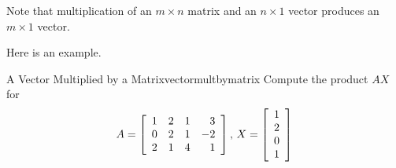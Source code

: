 Note that multiplication of an $m \times n$ matrix and an $n \times 1$ vector produces an $m \times 1$ vector.

Here is an example.

\begin{example}{A Vector Multiplied by a Matrix}{vectormultbymatrix}
Compute the product $AX$ for 
\begin{equation*}
A = \left[
\begin{array}{rrrr}
1 & 2 & 1 & 3 \\
0 & 2 & 1 & -2 \\
2 & 1 & 4 & 1
\end{array}
\right],\,  X =  \left[
\begin{array}{r}
1 \\
2 \\
0 \\
1
\end{array}
\right] 
\end{equation*}
\end{example}

